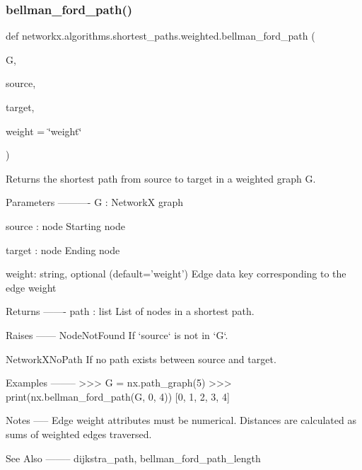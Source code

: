 \subsubsection{\texorpdfstring{bellman\+\_\+ford\+\_\+path()}{bellman\_ford\_path()}}
{\footnotesize\ttfamily def networkx.\+algorithms.\+shortest\+\_\+paths.\+weighted.\+bellman\+\_\+ford\+\_\+path (\begin{DoxyParamCaption}\item[{}]{G,  }\item[{}]{source,  }\item[{}]{target,  }\item[{}]{weight = {\ttfamily \char`\"{}weight\char`\"{}} }\end{DoxyParamCaption})}

\begin{DoxyVerb}Returns the shortest path from source to target in a weighted graph G.

Parameters
----------
G : NetworkX graph

source : node
    Starting node

target : node
    Ending node

weight: string, optional (default='weight')
    Edge data key corresponding to the edge weight

Returns
-------
path : list
    List of nodes in a shortest path.

Raises
------
NodeNotFound
    If `source` is not in `G`.

NetworkXNoPath
    If no path exists between source and target.

Examples
--------
>>> G = nx.path_graph(5)
>>> print(nx.bellman_ford_path(G, 0, 4))
[0, 1, 2, 3, 4]

Notes
-----
Edge weight attributes must be numerical.
Distances are calculated as sums of weighted edges traversed.

See Also
--------
dijkstra_path, bellman_ford_path_length
\end{DoxyVerb}
 \mbox{\label{namespacenetworkx_1_1algorithms_1_1shortest__paths_1_1weighted_a985b3fe02368560b5bfcf3506ab479f7}} 
